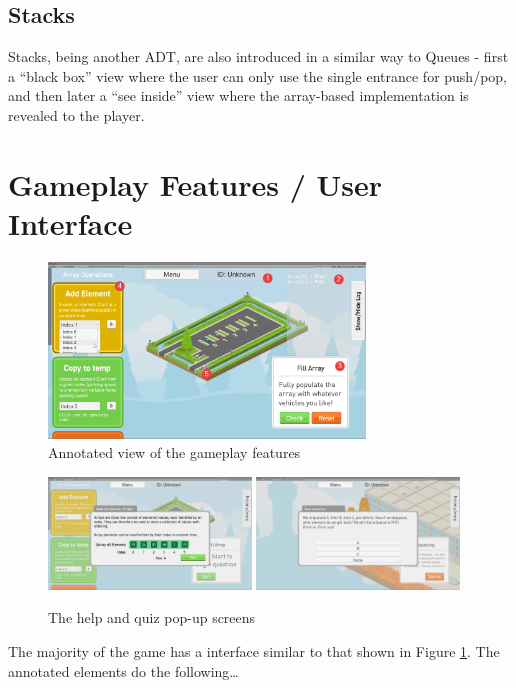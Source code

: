 \documentclass[10pt]{article}
\begin{document}
\subsection{Stacks}
Stacks, being another ADT, are also introduced in a similar way to Queues - first a ``black box'' view where the user can only use the single entrance for push/pop, and then later a ``see inside'' view where the array-based implementation is revealed to the player.
\section{Gameplay Features / User Interface}
\begin{figure}
  \centering
  \includegraphics[width=0.75\textwidth]{images/annotatedelements.png}
\caption{Annotated view of the gameplay features}
\label{fig:annotatedelements}
\end{figure}
\begin{figure}
  \centering
  \includegraphics[width=0.48\textwidth]{images/help.png}
  \includegraphics[width=0.48\textwidth]{images/quiz.png}
\caption{The help and quiz pop-up screens}
\label{fig:helpquiz}
\end{figure}
The majority of the game has a interface similar to that shown in Figure \ref{fig:annotatedelements}. The annotated elements do the following\dots
\end{document}
